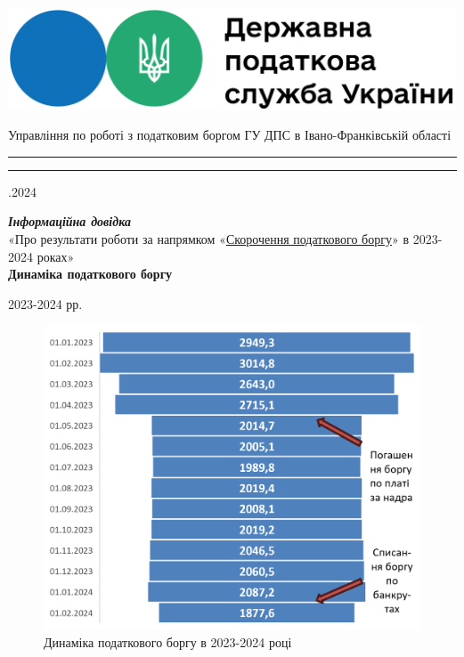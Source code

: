 \documentclass[a4paper,14pt]{article}
\begin{document}
	
	\begin{minipage}{0.4\textwidth}
	\includegraphics[scale=0.12]{Logo_DPSMain.png} 
	\end{minipage}
\hfill
\hfill
	\begin{minipage}{0.45\textwidth}
		\begin{center}
	Управління по роботі з податковим боргом ГУ ДПС в Івано-Франківській області
		\end{center}
   \end{minipage}

\bigskip

\hrule height 2pt\smallskip
\hrule height 0.5pt%
.2024	
\begin{center}

	
\emph{\textbf{Інформаційна довідка}}\\
«Про результати роботи за напрямком «\underline{Скорочення податкового боргу}» в 2023-2024 роках»\\
\bigskip
\textbf{Динаміка податкового боргу }

2023-2024 рр.
	
\end{center}

\begin{figure}[h]
	\centering
	\includegraphics[width=1\linewidth]{"Динаміка податкового боргу помісячно"}
	\caption{Динаміка податкового боргу в 2023-2024 році}
	\label{fig:-1}
\end{figure}
\end{document}
